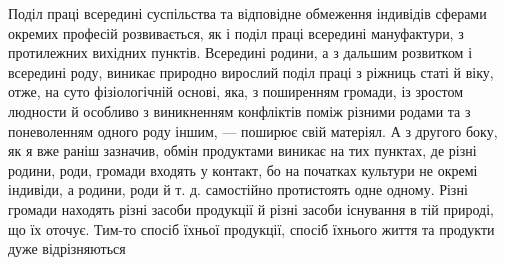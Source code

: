 Поділ праці всередині суспільства та відповідне обмеження
індивідів сферами окремих професій розвивається, як і поділ
праці всередині мануфактури, з протилежних вихідних пунктів.
Всередині родини, а з дальшим розвитком і всередині роду,
виникає природно вирослий поділ праці з ріжниць статі й віку,
отже, на суто фізіологічній основі, яка, з поширенням громади,
із зростом людности й особливо з виникненням конфліктів поміж
різними родами та з поневоленням одного роду іншим, — поширює
свій матеріял. А з другого боку, як я вже раніш зазначив,
обмін продуктами виникає на тих пунктах, де різні родини,
роди, громади входять у контакт, бо на початках культури не
окремі індивіди, а родини, роди й т. д. самостійно протистоять одне
одному. Різні громади находять різні засоби продукції й різні
засоби існування в тій природі, що їх оточує. Тим-то спосіб їхньої
продукції, спосіб їхнього життя та продукти дуже відрізняються
\parbreak{}  %
